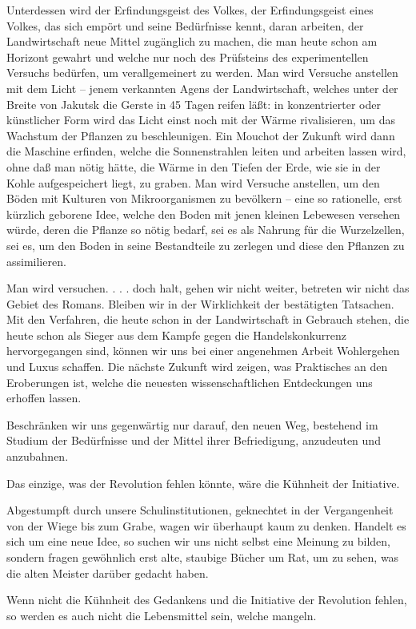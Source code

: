 \documentclass{scrbook}
\begin{document}
Unterdessen wird der Erfindungsgeist des Volkes, der Erfindungsgeist eines Volkes, das sich empört und seine Bedürfnisse kennt, daran arbeiten, der Landwirtschaft neue Mittel zugänglich zu machen, die man heute schon am Horizont gewahrt und welche nur noch des Prüfsteins des experimentellen Versuchs bedürfen, um verallgemeinert zu werden. Man wird Versuche anstellen mit dem Licht – jenem verkannten Agens der Landwirtschaft, welches unter der Breite von Jakutsk die Gerste in 45 Tagen reifen läßt: in konzentrierter oder künstlicher Form wird das Licht einst noch mit der Wärme rivalisieren, um das Wachstum der Pflanzen zu beschleunigen. Ein Mouchot der Zukunft wird dann die Maschine erfinden, welche die Sonnenstrahlen leiten und arbeiten lassen wird, ohne daß man nötig hätte, die Wärme in den Tiefen der Erde, wie sie in der Kohle aufgespeichert liegt, zu graben. Man wird Versuche anstellen, um den Böden mit Kulturen von Mikroorganismen zu bevölkern – eine so rationelle, erst kürzlich geborene Idee, welche den Boden mit jenen kleinen Lebewesen versehen würde, deren die Pflanze so nötig bedarf, sei es als Nahrung für die Wurzelzellen, sei es, um den Boden in seine Bestandteile zu zerlegen und diese den Pflanzen zu assimilieren.

Man wird versuchen. . . . doch halt, gehen wir nicht weiter, betreten wir nicht das Gebiet des Romans. Bleiben wir in der Wirklichkeit der bestätigten Tatsachen. Mit den Verfahren, die heute schon in der Landwirtschaft in Gebrauch stehen, die heute schon als Sieger aus dem Kampfe gegen die Handelskonkurrenz hervorgegangen sind, können wir uns bei einer angenehmen Arbeit Wohlergehen und Luxus schaffen. Die nächste Zukunft wird zeigen, was Praktisches an den Eroberungen ist, welche die neuesten wissenschaftlichen Entdeckungen uns erhoffen lassen.

Beschränken wir uns gegenwärtig nur darauf, den neuen Weg, bestehend im Studium der Bedürfnisse und der Mittel ihrer Befriedigung, anzudeuten und anzubahnen.

Das einzige, was der Revolution fehlen könnte, wäre die Kühnheit der Initiative.

Abgestumpft durch unsere Schulinstitutionen, geknechtet in der Vergangenheit von der Wiege bis zum Grabe, wagen wir überhaupt kaum zu denken. Handelt es sich um eine neue Idee, so suchen wir uns nicht selbst eine Meinung zu bilden, sondern fragen gewöhnlich erst alte, staubige Bücher um Rat, um zu sehen, was die alten Meister darüber gedacht haben.

Wenn nicht die Kühnheit des Gedankens und die Initiative der Revolution fehlen, so werden es auch nicht die Lebensmittel sein, welche mangeln.
\end{document}
